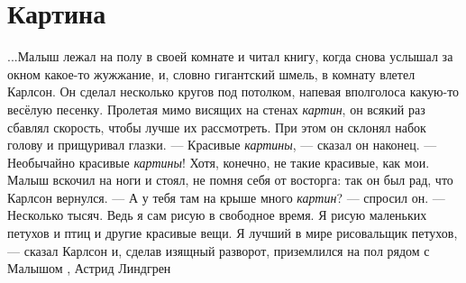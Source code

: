  
 
 
 
 
\chapter{Картина}

...Малыш лежал на полу в своей комнате и читал книгу, когда снова услышал за
окном какое-то жужжание, и, словно гигантский шмель, в комнату влетел Карлсон.
Он сделал несколько кругов под потолком, напевая вполголоса какую-то весёлую
песенку. Пролетая мимо висящих на стенах \emph{картин}, он всякий раз сбавлял
скорость, чтобы лучше их рассмотреть. При этом он склонял набок голову и
прищуривал глазки.  — Красивые \emph{картины}, — сказал он наконец. — Необычайно
красивые \emph{картины}! Хотя, конечно, не такие красивые, как мои.  Малыш вскочил на
ноги и стоял, не помня себя от восторга: так он был рад, что Карлсон вернулся.
— А у тебя там на крыше много \emph{картин}? — спросил он.  — Несколько тысяч. Ведь я
сам рисую в свободное время. Я рисую маленьких петухов и птиц и другие красивые
вещи. Я лучший в мире рисовальщик петухов, — сказал Карлсон и, сделав изящный
разворот, приземлился на пол рядом с Малышом
, Астрид Линдгрен
